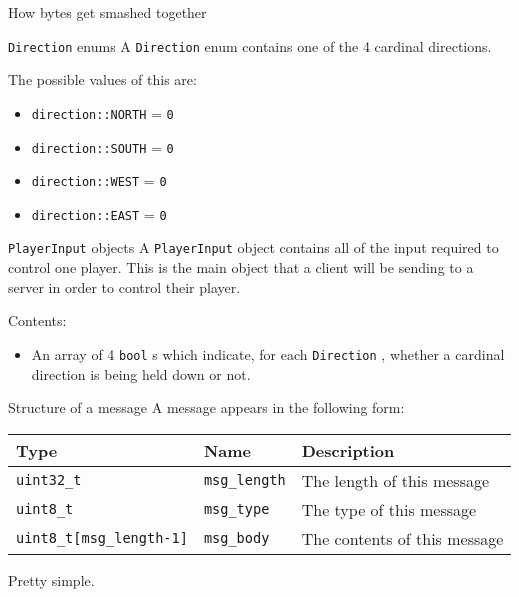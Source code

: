 \documentclass[a4paper,draft]{article}
\begin{document}
\begin{section}{How bytes get smashed together}
  \begin{subsection}{\texttt{Direction} enums}
    A \texttt{Direction} enum contains one of the 4 cardinal directions.

    The possible values of this are:

    \begin{itemize}
      \item \texttt{direction::NORTH} = \texttt{0}
      \item \texttt{direction::SOUTH} = \texttt{0}
      \item \texttt{direction::WEST} = \texttt{0}
      \item \texttt{direction::EAST} = \texttt{0}
    \end{itemize}
  \end{subsection}

  \begin{subsection}{\texttt{PlayerInput} objects}
    A \texttt{PlayerInput} object contains all of the input required to control one player.
    This is the main object that a client will be sending to a server in order to control their player.

    Contents:

    \begin{itemize}
      \item An array of 4 \texttt{bool} s which indicate, for each \texttt{Direction} , whether a cardinal direction is being held down or not.
    \end{itemize}
  \end{subsection}
\end{section}

\begin{section}{Structure of a message}
  A message appears in the following form:

  \begin{tabular}{lll}
    \hline
    Type & Name & Description \\
    \hline
    \texttt{uint32\_t} & \texttt{msg\_length} & The length of this message \\
    \texttt{uint8\_t} & \texttt{msg\_type} & The type of this message \\
    \texttt{uint8\_t[msg\_length-1]} & \texttt{msg\_body} & The contents of this message \\
    \hline
  \end{tabular}

  Pretty simple.
\end{section}
\end{document}
